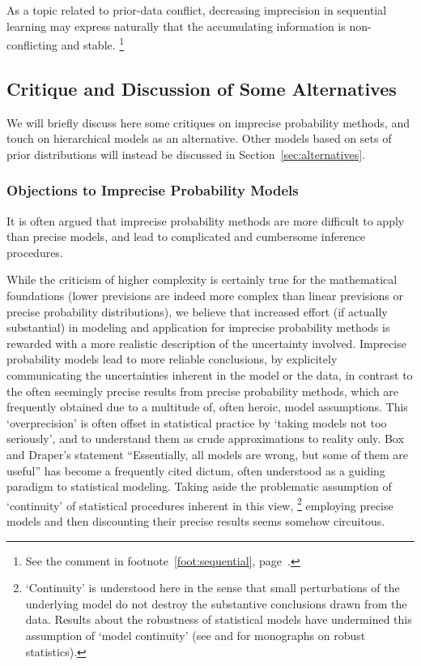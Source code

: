 As a topic related to prior-data conflict, decreasing imprecision in sequential learning
may express naturally that the accumulating information is non-conflicting and stable.%
\footnote{See the comment in footnote~\ref{foot:sequential}, page~\pageref{foot:sequential}.}


\subsection{Critique and Discussion of Some Alternatives}
\label{sec:ip-alternatives}

We will briefly discuss here some critiques on imprecise probability methods,
and touch on hierarchical models as an alternative.
Other models based on sets of prior distributions will instead be discussed in Section~\ref{sec:alternatives}.

\subsubsection{Objections to Imprecise Probability Models}
\label{sec:objections}

It is often argued that imprecise probability methods are more difficult to apply than precise models,
and lead to complicated and cumbersome inference procedures.

While the criticism of higher complexity is certainly true for the mathematical foundations
(lower previsions are indeed more complex than linear previsions or precise probability distributions),
we believe that increased effort (if actually substantial) in modeling and application 
for imprecise probability methods
is rewarded with a more realistic description of the uncertainty involved.
Imprecise probability models lead to more reliable conclusions,
by explicitely communicating the uncertainties inherent in the model or the data,
in contrast to the often seemingly precise results from precise probability methods,
which are frequently obtained due to a multitude of, often heroic, model assumptions. 
This `overprecision' is often offset in statistical practice by `taking models not too seriously',
and to understand them as crude approximations to reality only.
Box and Draper's statement ``Essentially, all models are wrong, but some of them are useful'' \parencite[p.~424]{1987:box}
has become a frequently cited dictum, often understood as a guiding paradigm to statistical modeling.
Taking aside the problematic assumption of `continuity' of statistical procedures inherent in this view,%
\footnote{`Continuity' is understood here in the sense that small perturbations of the underlying model
do not destroy the substantive conclusions drawn from the data.
Results about the robustness of statistical models have undermined this assumption of `model continuity'
(see \textcite{1981:huber} and \textcite{1986:hampel} for monographs on robust statistics).}
employing precise models and then discounting their precise results
seems somehow circuitous.

